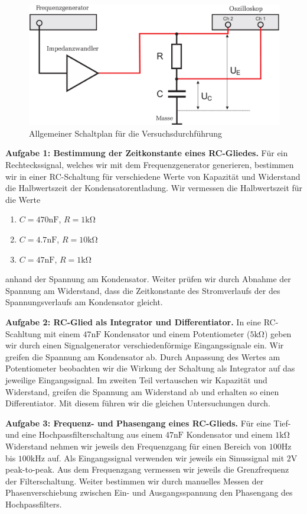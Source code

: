 \begin{figure}[H]
  \centering
  \includegraphics[width=.70\textwidth]{files/script/schaltplan_versuchsdurchfuehrung.png}
  \caption{Allgemeiner Schaltplan für die Versuchsdurchführung}
  \label{fig:schaltplan_versuchsdurchfuehrung}
\end{figure}

\textbf{Aufgabe 1: Bestimmung der Zeitkonstante eines RC-Gliedes.} Für ein Rechteckssignal, welches wir mit dem Frequenzgenerator generieren, bestimmen wir in einer RC-Schaltung für verschiedene Werte von Kapazität und Widerstand die Halbwertszeit der Kondensatorentladung. Wir vermessen die Halbwertszeit für die Werte
\begin{enumerate}
  \item $C = 470 \si{\nano\farad}$, $R = 1 \si{\kilo\ohm}$
  \item $C = 4.7 \si{\nano\farad}$, $R = 10 \si{\kilo\ohm}$
  \item $C = 47 \si{\nano\farad}$, $R = 1 \si{\kilo\ohm}$
\end{enumerate}
anhand der Spannung am Kondensator. Weiter prüfen wir durch Abnahme der Spannung am Widerstand, dass die Zeitkonstante des Stromverlaufs der des Spannungsverlaufs am Kondensator gleicht.

\textbf{Aufgabe 2: RC-Glied als Integrator und Differentiator.} In eine RC-Scahltung mit einem $47 \si{\nano\farad}$ Kondensator und einem Potentiometer ($5\si{\kilo\ohm}$) geben wir durch einen Signalgenerator verschiedenförmige Eingangssignale ein. Wir greifen die Spannung am Kondensator ab. Durch Anpassung des Wertes am Potentiometer beobachten wir die Wirkung der Schaltung als Integrator auf das jeweilige Eingangssignal. Im zweiten Teil vertauschen wir Kapazität und Widerstand, greifen die Spannung am Widerstand ab und erhalten so einen Differentiator. Mit diesem führen wir die gleichen Untersuchungen durch.

\textbf{Aufgabe 3: Frequenz- und Phasengang eines RC-Glieds.} Für eine Tief- und eine Hochpassfilterschaltung aus einem $47\si{\nano\farad}$ Kondensator und einem $1 \si{\kilo\ohm}$ Widerstand nehmen wir jeweils den Frequenzgang für einen Bereich von $100\si{\hertz}$ bis $100\si{\kilo\hertz}$ auf. Als Eingangssignal verwenden wir jeweils ein Sinussignal mit $2 \si{\volt}$ peak-to-peak. Aus dem Frequenzgang vermessen wir jeweils die Grenzfrequenz der Filterschaltung. Weiter bestimmen wir durch manuelles Messen der Phasenverschiebung zwischen Ein- und Ausgangsspannung den Phasengang des Hochpassfilters.

